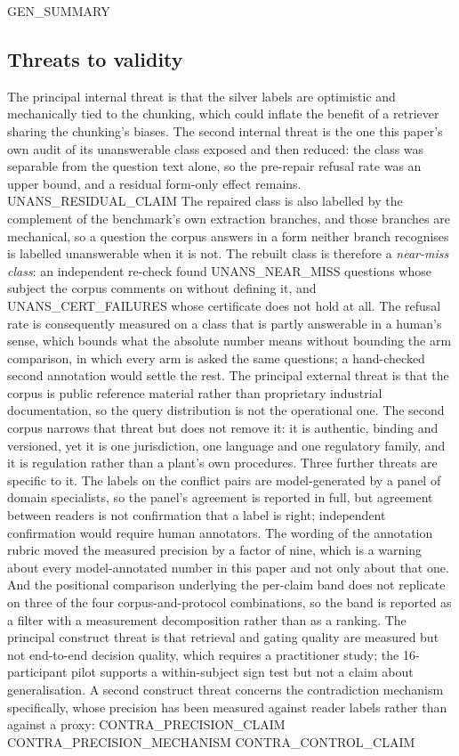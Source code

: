 \documentclass[preprint,3p,times]{elsarticle}
\begin{document}
{{GEN_SUMMARY}}

\subsection{Threats to validity}

The principal internal threat is that the silver labels are optimistic and
mechanically tied to the chunking, which could inflate the benefit of a
retriever sharing the chunking's biases. The second internal threat is the
one this paper's own audit of its unanswerable class exposed and then
reduced: the class was separable from the question text alone, so the
pre-repair refusal rate was an upper bound, and a residual form-only effect
remains. {{UNANS_RESIDUAL_CLAIM}} The repaired class is also labelled by the complement of the
benchmark's own extraction branches, and those branches are mechanical, so a
question the corpus answers in a form neither branch recognises is labelled
unanswerable when it is not. The rebuilt class is therefore a \emph{near-miss
class}: an independent re-check found {{UNANS_NEAR_MISS}} questions
whose subject the corpus comments on without
defining it, and {{UNANS_CERT_FAILURES}} whose certificate does not hold at
all. The refusal rate is consequently measured on a class that is partly
answerable in a human's sense, which bounds what the absolute number means
without bounding the arm comparison, in which every arm is asked the same
questions; a hand-checked second annotation would settle the rest. The principal external threat is that
the corpus is public reference material rather than proprietary industrial
documentation, so the query distribution is not the operational one. The
second corpus narrows that threat but does not remove it: it is authentic,
binding and versioned, yet it is one jurisdiction, one language and one
regulatory family, and it is regulation rather than a plant's own procedures.
Three further threats are specific to it. The labels on the conflict pairs
are model-generated by a panel of domain specialists, so the panel's
agreement is reported in full, but agreement between readers is not
confirmation that a label is right; independent confirmation would require
human annotators. The wording of the annotation rubric moved the measured
precision by a factor of nine, which is a warning about every
model-annotated number in this paper and not only about that one. And the
positional comparison underlying the per-claim band does not replicate on
three of the four corpus-and-protocol combinations, so the band is reported
as a filter with a measurement decomposition rather than as a ranking. The
principal construct threat is that retrieval and gating quality are measured
but not end-to-end decision quality, which requires a practitioner study; the
16-participant pilot supports a within-subject sign test but not a claim about
generalisation. A second construct threat concerns the contradiction
mechanism specifically, whose precision has been measured against reader
labels rather than against a proxy: {{CONTRA_PRECISION_CLAIM}}
{{CONTRA_PRECISION_MECHANISM}} {{CONTRA_CONTROL_CLAIM}}
\end{document}
